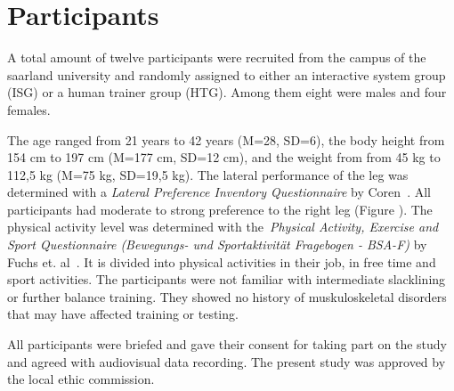 \section{Participants}\label{6_participants}
A total amount of twelve participants were recruited from the campus of the saarland university and randomly assigned to either an interactive system group (ISG) or a human trainer group (HTG).
Among them eight were males and four females.

The age ranged from 21 years to 42 years (M=28, SD=6), the body height from 154 cm to 197 cm (M=177 cm, SD=12 cm), and the weight from from 45 kg to 112,5 kg (M=75 kg, SD=19,5 kg).
The lateral performance of the leg was determined with a \textit{Lateral Preference Inventory Questionnaire} by Coren~\cite{Coren1993-lp}. All participants had moderate to strong preference to the right leg (Figure ).
The physical activity level was determined with the~\textit{Physical Activity, Exercise and Sport Questionnaire (Bewegungs- und Sportaktivität Fragebogen - BSA-F)} by Fuchs et. al~\cite{Fuchs2015-bsa}.
It is divided into physical activities in their job, in free time and sport activities.
The participants were not familiar with intermediate slacklining or further balance training. They showed no history of muskuloskeletal disorders that may have affected training or testing.

All participants were briefed and gave their consent for taking part on the study and agreed with audiovisual data recording.
The present study was approved by the local ethic commission.

